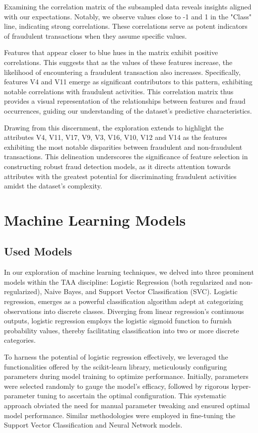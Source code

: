 \documentclass[conference]{IEEEtran}
\begin{document}
Examining the correlation matrix of the subsampled data reveals insights aligned with our expectations. Notably, we observe values close to -1 and 1 in the "Class" line, indicating strong correlations. These correlations serve as potent indicators of fraudulent transactions when they assume specific values.

Features that appear closer to blue hues in the matrix exhibit positive correlations. This suggests that as the values of these features increase, the likelihood of encountering a fraudulent transaction also increases. Specifically, features V4 and V11 emerge as significant contributors to this pattern, exhibiting notable correlations with fraudulent activities. This correlation matrix thus provides a visual representation of the relationships between features and fraud occurrences, guiding our understanding of the dataset's predictive characteristics.

Drawing from this discernment, the exploration extends to highlight the attributes V4, V11, V17, V9, V3, V16, V10, V12 and V14 as the features exhibiting the most notable disparities between fraudulent and non-fraudulent transactions. This delineation underscores the significance of feature selection in constructing robust fraud detection models, as it directs attention towards attributes with the greatest potential for discriminating fraudulent activities amidst the dataset's complexity.

\section{Machine Learning Models}

\subsection{Used Models}

In our exploration of machine learning techniques, we delved into three prominent models within the TAA discipline: Logistic Regression (both regularized and non-regularized), Naive Bayes, and Support Vector Classification (SVC). Logistic regression, emerges as a powerful classification algorithm adept at categorizing observations into discrete classes. Diverging from linear regression's continuous outputs, logistic regression employs the logistic sigmoid function to furnish probability values, thereby facilitating classification into two or more discrete categories.

To harness the potential of logistic regression effectively, we leveraged the functionalities offered by the scikit-learn library, meticulously configuring parameters during model training to optimize performance. Initially, parameters were selected randomly to gauge the model's efficacy, followed by rigorous hyper-parameter tuning to ascertain the optimal configuration. This systematic approach obviated the need for manual parameter tweaking and ensured optimal model performance. Similar methodologies were employed in fine-tuning the Support Vector Classification and Neural Network models.
\end{document}
